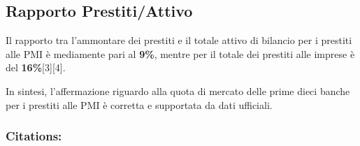 \documentclass[
  letterpaper,
  DIV=11,
  numbers=noendperiod]{scrartcl}
\begin{document}
\subsection{Rapporto Prestiti/Attivo}\label{rapporto-prestitiattivo}

Il rapporto tra l'ammontare dei prestiti e il totale attivo di bilancio
per i prestiti alle PMI è mediamente pari al \textbf{9\%}, mentre per il
totale dei prestiti alle imprese è del \textbf{16\%}{[}3{]}{[}4{]}.

\begin{tcolorbox}[enhanced jigsaw, coltitle=black, colbacktitle=quarto-callout-warning-color!10!white, bottomtitle=1mm, colback=white, bottomrule=.15mm, breakable, arc=.35mm, opacitybacktitle=0.6, toprule=.15mm, left=2mm, colframe=quarto-callout-warning-color-frame, title=\textcolor{quarto-callout-warning-color}{\faExclamationTriangle}\hspace{0.5em}{Conclusione}, titlerule=0mm, toptitle=1mm, rightrule=.15mm, leftrule=.75mm, opacityback=0]

In sintesi, l'affermazione riguardo alla quota di mercato delle prime
dieci banche per i prestiti alle PMI è corretta e supportata da dati
ufficiali.

\end{tcolorbox}

\subsubsection{Citations:}\label{citations}
\end{document}
